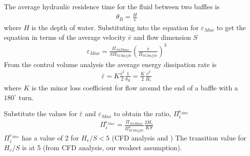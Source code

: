 \documentclass[letterpaper,10pt,english]{sphinxmanual}
\begin{document}
The average hydraulic residence time for the fluid between two baffles
is
\begin{equation}\label{equation:Rapid_Mix/RM_Derivations:Rapid_Mix/RM_Derivations:126}
\begin{split}\theta_B = \frac{H}{\bar v}\end{split}
\end{equation}
where \(H\) is the depth of water. Substituting into the equation for \(\varepsilon_{Max}\) to get the equation in terms of the average velocity \(\bar v\) and flow dimension \(S\)
\begin{equation}\label{equation:Rapid_Mix/RM_Derivations:Rapid_Mix/RM_Derivations:127}
\begin{split}\varepsilon_{Max}= \frac{\Pi_{JetPlane}}{S \Pi_{VCBaffle}} \left( \frac{ \bar v}{\Pi_{VCBaffle}} \right)^3\end{split}
\end{equation}
From the control volume analysis the average energy dissipation rate is
\begin{equation}\label{equation:Rapid_Mix/RM_Derivations:Rapid_Mix/RM_Derivations:128}
\begin{split}\bar \varepsilon = K \frac{\bar v^2}{2} \frac{1}{\theta_B} = \frac{K}{2} \frac{\bar v^3}{H_e}\end{split}
\end{equation}
where \(K\) is the minor loss coefficient for flow around the end of a baffle with a \(180^\circ\) turn.

Substitute the values for \(\bar \varepsilon\) and
\(\varepsilon_{Max}\) to obtain the ratio,
\(\Pi_{\bar \epsilon}^{\epsilon_{Max}}\)
\begin{equation}\label{equation:Rapid_Mix/RM_Derivations:Rapid_Mix/RM_Derivations:129}
\begin{split}\Pi_{\bar \epsilon}^{\epsilon_{Max}} = \frac{\Pi_{JetPlane}}{\Pi_{VCBaffle}^4} \frac{2 H_e}{K S}\end{split}
\end{equation}
\(\Pi_{\bar \varepsilon}^{\varepsilon_{Max}}\) has a value of 2 for
\(H_e/S <5\) (CFD analysis and )
The transition value for \(H_e/S\) is at 5 (from CFD analysis, our weakest assumption).
\end{document}
